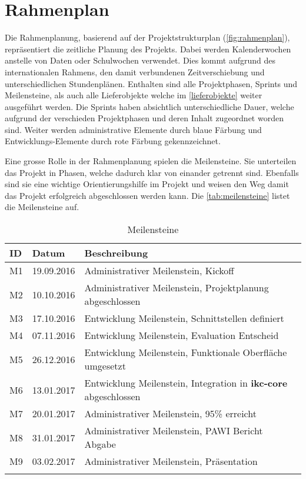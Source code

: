 \newpage

\section{Rahmenplan}
Die Rahmenplanung, basierend auf der Projektstrukturplan (\autoref{fig:rahmenplan}), repräsentiert die zeitliche Planung des Projekts. Dabei werden Kalenderwochen anstelle von Daten oder Schulwochen verwendet. Dies kommt aufgrund des internationalen Rahmens, den damit verbundenen Zeitverschiebung und unterschiedlichen Stundenplänen. Enthalten sind alle Projektphasen, Sprints und Meilensteine, als auch alle Lieferobjekte welche im \autoref{lieferobjekte} weiter ausgeführt werden. Die Sprints haben absichtlich unterschiedliche Dauer, welche aufgrund der verschieden Projektphasen und deren Inhalt zugeordnet worden sind. Weiter werden administrative Elemente durch blaue Färbung und Entwicklungs-Elemente durch rote Färbung gekennzeichnet.

Eine grosse Rolle in der Rahmenplanung spielen die Meilensteine. Sie unterteilen das Projekt in Phasen, welche dadurch klar von einander getrennt sind. Ebenfalls sind sie eine wichtige Orientierungshilfe im Projekt und weisen den Weg damit das Projekt erfolgreich abgeschlossen werden kann. Die \autoref{tab:meilensteine} listet die Meilensteine auf.


\begin{longtable}{|p{1cm}|p{2cm}|p{8.5cm}|}
  \hline
    ID & Datum &  Beschreibung \\\hline
    M1 & 19.09.2016 & Administrativer Meilenstein, Kickoff\\\hline
    M2 & 10.10.2016 & Administrativer Meilenstein, Projektplanung abgeschlossen\\\hline
    M3 & 17.10.2016 & Entwicklung Meilenstein, Schnittstellen definiert\\\hline
    M4 & 07.11.2016 & Entwicklung Meilenstein, Evaluation Entscheid\\\hline
    M5 & 26.12.2016 & Entwicklung Meilenstein, Funktionale Oberfläche umgesetzt\\\hline
    M6 & 13.01.2017 & Entwicklung Meilenstein, Integration in \textbf{ikc-core} abgeschlossen\\\hline
    M7 & 20.01.2017 & Administrativer Meilenstein, 95\% erreicht\\\hline
    M8 & 31.01.2017 & Administrativer Meilenstein, PAWI Bericht Abgabe\\\hline
    M9 & 03.02.2017 & Administrativer Meilenstein, Präsentation\\\hline
    \caption{Meilensteine}
  \label{tab:meilensteine}
\end{longtable}

